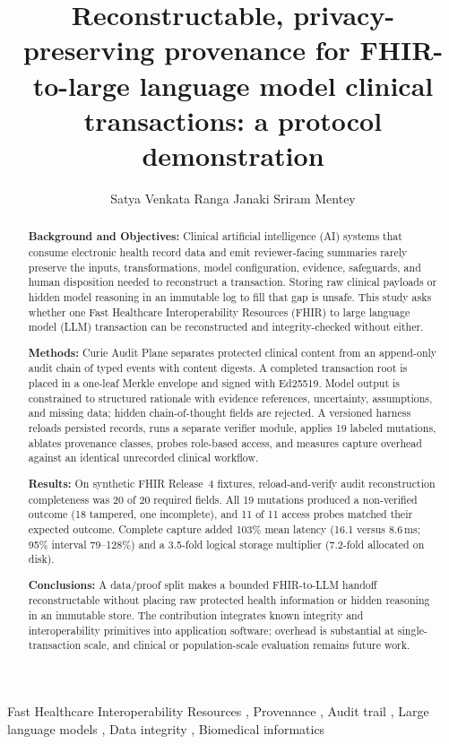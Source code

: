 \documentclass[preprint,review,12pt]{elsarticle}
\begin{document}
\begin{frontmatter}

\title{Reconstructable, privacy-preserving provenance for FHIR-to-large language model clinical transactions: a protocol demonstration}

\author[addr]{Satya Venkata Ranga Janaki Sriram Mentey}

\begin{abstract}
\noindent\textbf{Background and Objectives:}
Clinical artificial intelligence (AI) systems that consume electronic health
record data and emit reviewer-facing summaries rarely preserve the inputs,
transformations, model configuration, evidence, safeguards, and human
disposition needed to reconstruct a transaction. Storing raw clinical payloads
or hidden model reasoning in an immutable log to fill that gap is unsafe. This
study asks whether one Fast Healthcare Interoperability Resources (FHIR) to
large language model (LLM) transaction can be reconstructed and
integrity-checked without either.

\noindent\textbf{Methods:}
Curie Audit Plane separates protected clinical content from an append-only
audit chain of typed events with content digests. A completed transaction root
is placed in a one-leaf Merkle envelope and signed with Ed25519. Model output is
constrained to structured rationale with evidence references, uncertainty,
assumptions, and missing data; hidden chain-of-thought fields are rejected. A
versioned harness reloads persisted records, runs a separate verifier module,
applies 19 labeled mutations, ablates provenance classes, probes role-based
access, and measures capture overhead against an identical unrecorded clinical
workflow.

\noindent\textbf{Results:}
On synthetic FHIR Release~4 fixtures, reload-and-verify audit reconstruction
completeness was 20 of 20 required fields. All 19 mutations produced a
non-verified outcome (18 tampered, one incomplete), and 11 of 11 access probes
matched their expected outcome. Complete capture added 103\% mean latency
(16.1 versus 8.6\,ms; 95\% interval 79--128\%) and a 3.5-fold logical storage
multiplier (7.2-fold allocated on disk).

\noindent\textbf{Conclusions:}
A data/proof split makes a bounded FHIR-to-LLM handoff reconstructable without
placing raw protected health information or hidden reasoning in an immutable
store. The contribution integrates known integrity and interoperability
primitives into application software; overhead is substantial at
single-transaction scale, and clinical or population-scale evaluation remains
future work.
\end{abstract}

\begin{keyword}
Fast Healthcare Interoperability Resources \sep
Provenance \sep
Audit trail \sep
Large language models \sep
Data integrity \sep
Biomedical informatics
\end{keyword}

\end{frontmatter}
\end{document}
